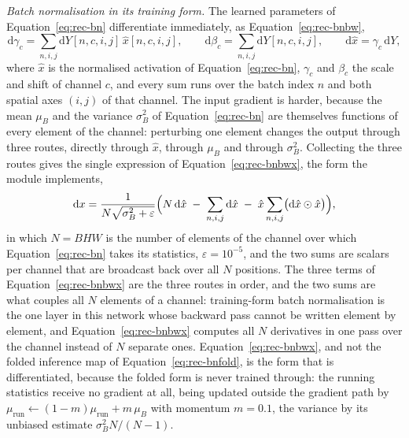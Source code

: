 \emph{Batch normalisation in its training form.} The learned parameters of Equation~\ref{eq:rec-bn} differentiate immediately, as Equation~\ref{eq:rec-bnbw},
\begin{equation}
\mathrm d\gamma_c=\sum_{n,i,j}\mathrm dY[n,c,i,j]\,\hat x[n,c,i,j],\qquad
\mathrm d\beta_c=\sum_{n,i,j}\mathrm dY[n,c,i,j],\qquad
\mathrm d\hat x=\gamma_c\,\mathrm dY,
\label{eq:rec-bnbw}
\end{equation}
where $\hat x$ is the normalised activation of Equation~\ref{eq:rec-bn}, $\gamma_c$ and $\beta_c$ the scale and shift of channel $c$, and every sum runs over the batch index $n$ and both spatial axes $(i,j)$ of that channel.
The input gradient is harder, because the mean $\mu_B$ and the variance $\sigma_B^2$ of Equation~\ref{eq:rec-bn} are themselves functions of every element of the channel: perturbing one element changes the output through three routes, directly through $\hat x$, through $\mu_B$ and through $\sigma_B^2$.
Collecting the three routes gives the single expression of Equation~\ref{eq:rec-bnbwx}, the form the module implements,
\begin{equation}
\mathrm dx=\frac{1}{N\sqrt{\sigma_B^2+\varepsilon}}\Bigl(N\,\mathrm d\hat x\;-\;\sum_{n,i,j}\mathrm d\hat x\;-\;\hat x\sum_{n,i,j}\bigl(\mathrm d\hat x\odot\hat x\bigr)\Bigr),
\label{eq:rec-bnbwx}
\end{equation}
in which $N=BHW$ is the number of elements of the channel over which Equation~\ref{eq:rec-bn} takes its statistics, $\varepsilon=10^{-5}$, and the two sums are scalars per channel that are broadcast back over all $N$ positions.
The three terms of Equation~\ref{eq:rec-bnbwx} are the three routes in order, and the two sums are what couples all $N$ elements of a channel: training-form batch normalisation is the one layer in this network whose backward pass cannot be written element by element, and Equation~\ref{eq:rec-bnbwx} computes all $N$ derivatives in one pass over the channel instead of $N$ separate ones.
Equation~\ref{eq:rec-bnbwx}, and not the folded inference map of Equation~\ref{eq:rec-bnfold}, is the form that is differentiated, because the folded form is never trained through: the running statistics receive no gradient at all, being updated outside the gradient path by $\mu_{\mathrm{run}}\leftarrow(1-m)\mu_{\mathrm{run}}+m\,\mu_B$ with momentum $m=0.1$, the variance by its unbiased estimate $\sigma_B^2N/(N-1)$.


